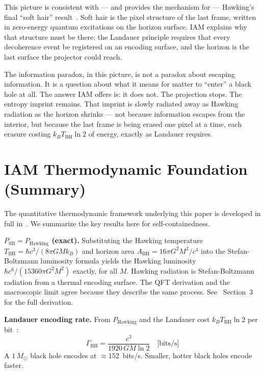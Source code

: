 \documentclass[12pt,letterpaper]{article}
\begin{document}
This picture is consistent with --- and provides the mechanism for ---
Hawking's final ``soft hair'' result~\cite{HawkingPerry2016}.
Soft hair is the pixel structure of the last frame, written
in zero-energy quantum excitations on the horizon surface.
IAM explains why that structure must be there:
the Landauer principle requires that every decoherence event
be registered on an encoding surface, and the horizon is the
last surface the projector could reach.

The information paradox, in this picture, is not a paradox
about escaping information. It is a question about what it means
for matter to ``enter'' a black hole at all. The answer IAM
offers is: it does not. The projection stops. The entropy imprint
remains. That imprint is slowly radiated away as Hawking radiation
as the horizon shrinks --- not because information escapes from
the interior, but because the last frame is being erased one
pixel at a time, each erasure costing $k_B T_\text{BH} \ln 2$
of energy, exactly as Landauer requires.

\section{IAM Thermodynamic Foundation (Summary)}

The quantitative thermodynamic framework underlying this paper is
developed in full in~\cite{MahaffeyBHThermo2026}.
We summarize the key results here for self-containedness.

\textbf{$P_\text{SB} = P_\text{Hawking}$ (exact).}
Substituting the Hawking temperature $T_\text{BH} = \hbar c^3/(8\pi GMk_B)$
and horizon area $A_\text{BH} = 16\pi G^2M^2/c^4$ into the
Stefan-Boltzmann luminosity formula yields the Hawking luminosity
$\hbar c^6/(15360\pi G^2M^2)$ exactly, for all $M$.
Hawking radiation is Stefan-Boltzmann radiation from a thermal
encoding surface. The QFT derivation and the macroscopic limit agree
because they describe the same process.
See~\cite{MahaffeyBHThermo2026} Section~3 for the full derivation.

\textbf{Landauer encoding rate.}
From $P_\text{Hawking}$ and the Landauer cost $k_BT_\text{BH}\ln 2$
per bit~\cite{Landauer1961}:
\begin{equation}
\Gamma_\text{BH} = \frac{c^3}{1920\,GM\ln 2} \quad \text{[bits/s]}
\label{eq:Gamma}
\end{equation}
A $1\,M_\odot$ black hole encodes at $\approx 152$~bits/s.
Smaller, hotter black holes encode faster.
\end{document}
